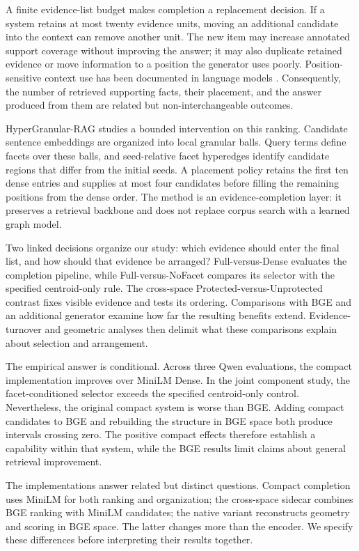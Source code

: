 \documentclass[11pt,a4paper]{article}
\newcommand{\hgrag}{HyperGranular-RAG\xspace}
\begin{document}
A finite evidence-list budget makes completion a replacement decision. If a system
retains at most twenty evidence units, moving an additional candidate into the
context can remove another unit. The new item may increase annotated support
coverage without improving the answer; it may also duplicate retained
evidence or move information to a position the generator uses poorly.
Position-sensitive context use has been documented in language models
\citep{liu2024lostmiddle}. Consequently, the number of retrieved supporting
facts, their placement, and the answer produced from them are related but
non-interchangeable outcomes.

\hgrag studies a bounded intervention on this ranking. Candidate sentence
embeddings are organized into local granular balls. Query terms define facets
over these balls, and seed-relative facet hyperedges identify candidate
regions that differ from the initial seeds. A placement policy retains the
first ten dense entries and supplies at most four candidates before filling
the remaining positions from the dense order. The method is an
evidence-completion layer: it preserves a retrieval backbone and does not
replace corpus search with a learned graph model.

Two linked decisions organize our study: which evidence should enter the
final list, and how should that evidence be arranged? Full-versus-Dense
evaluates the completion pipeline, while Full-versus-NoFacet compares its
selector with the specified centroid-only rule. The cross-space
Protected-versus-Unprotected contrast fixes visible evidence and tests its
ordering. Comparisons with BGE and an additional generator examine how far
the resulting benefits extend. Evidence-turnover and geometric analyses
then delimit what these comparisons explain about selection and arrangement.

The empirical answer is conditional. Across three Qwen evaluations, the
compact implementation improves over MiniLM Dense. In the joint
component study, the facet-conditioned selector exceeds the specified
centroid-only control. Nevertheless, the original compact system is worse
than BGE. Adding compact candidates to BGE and rebuilding the structure in
BGE space both produce intervals crossing zero. The positive compact effects
therefore establish a capability within that system, while the BGE results
limit claims about general retrieval improvement.

The implementations answer related but distinct questions. Compact completion
uses MiniLM for both ranking and organization; the cross-space sidecar combines
BGE ranking with MiniLM candidates; the native variant reconstructs geometry
and scoring in BGE space. The latter changes more than the encoder.
We specify these differences before interpreting their results together.
\end{document}
